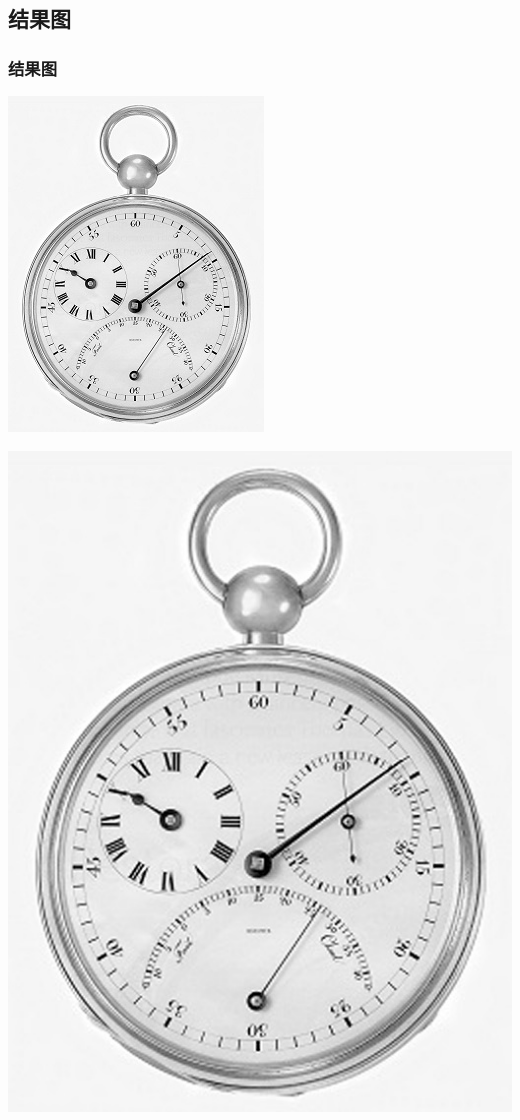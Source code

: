 \documentclass[notheorems,serif,table,compress]{beamer}  %
\begin{document}
\subsection{结果图}
\begin{frame}
\frametitle{结果图}
	\begin{minipage}[t]{0.4\linewidth}
        \centering
        \includegraphics[width=0.5\linewidth]{1.jpg} 
        \end{minipage}
	\begin{minipage}[t]{0.4\linewidth}
        \centering
        \includegraphics[width=1\linewidth]{Bicubic.jpg} 
        \end{minipage}
\end{frame}
\end{document}
